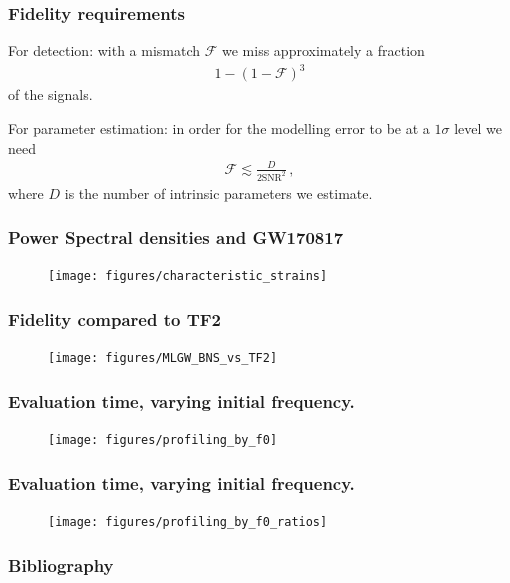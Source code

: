 \documentclass{beamer}
\begin{document}
\begin{frame}
    \frametitle{Fidelity requirements}
    For detection: with a mismatch \(\mathcal{F}\) we miss approximately a fraction 
    \begin{align}
    1 - (1 - \mathcal{F})^3
    \end{align}
    of the signals. 
    
    For parameter estimation: in order for the modelling error to be at a \(1 \sigma \) level we need 
    \begin{align}
    \mathcal{F} \lesssim \frac{D}{2 \text{SNR}^2}
    \,,
    \end{align}
    where \(D\) is the number of intrinsic parameters we estimate.
\end{frame}

\begin{frame}
    \frametitle{Power Spectral densities and GW170817}
    \begin{figure}[ht]
    \centering
    \vspace*{-.25cm}
    \texttt{[image: figures/characteristic\_strains]}
    \label{fig:characteristic_strains}
    \end{figure}
\end{frame}

\begin{frame}
    \frametitle{Fidelity compared to TF2}
    \begin{figure}[ht]
    \centering
    \texttt{[image: figures/MLGW\_BNS\_vs\_TF2]}
    \label{fig:MLGW_BNS_vs_TF2}
    \end{figure}
\end{frame}

\begin{frame}
    \frametitle{Evaluation time, varying initial frequency.}    
    \begin{figure}[ht]
    \centering
    \texttt{[image: figures/profiling\_by\_f0]}
    \label{fig:profiling_by_f0}
    \end{figure}
\end{frame}

\begin{frame}
    \frametitle{Evaluation time, varying initial frequency.}    
    \begin{figure}[ht]
    \centering
    \texttt{[image: figures/profiling\_by\_f0\_ratios]}
    \label{fig:profiling_by_f0_ratios}
    \end{figure}
\end{frame}

\begin{frame}
    \frametitle{Bibliography}
    \printbibliography
\end{frame}
\end{document}
